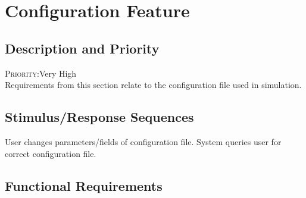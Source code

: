\section{Configuration Feature} \label{s:system-features:configuration-feature}
	\begin{comment}
		$<$Don’t really say “System Feature 1.” State the feature name in just a few 
		words.$>$
	\end{comment}

\subsection*{Description and Priority}
	\begin{comment}
		$<$Provide a short description of the feature and indicate whether it is of 
		High, Medium, or Low priority. You could also include specific priority 
		component ratings, such as benefit, penalty, cost, and risk (each rated on a 
		relative scale from a low of 1 to a high of 9).$>$
	\end{comment}
	\textsc{Priority:}Very High \\
	Requirements from this section relate to the configuration file used in simulation.
\subsection*{Stimulus/Response Sequences}
	\begin{comment}
		$<$List the sequences of user actions and system responses that stimulate the 
		behavior defined for this feature. These will correspond to the dialog elements 
		associated with use cases.$>$
	\end{comment}
	
	\stimresp
	{User changes parameters/fields of configuration file.}
	{System queries user for correct configuration file.}
	
\subsection*{Functional Requirements}
	\begin{comment}
		$<$Itemize the detailed functional requirements associated with this feature.  
		These are the software capabilities that must be present in order for the user 
		to carry out the services provided by the feature, or to execute the use case.  
		Include how the product should respond to anticipated error conditions or 
		invalid inputs. Requirements should be concise, complete, unambiguous, 
		verifiable, and necessary. Use “TBD” as a placeholder to indicate when necessary 
		information is not yet available.$>$
		
		$<$Each requirement should be uniquely identified with a sequence number or a 
		meaningful tag of some kind.$>$
		
		REQ-1:	REQ-2:
	\end{comment}
	
